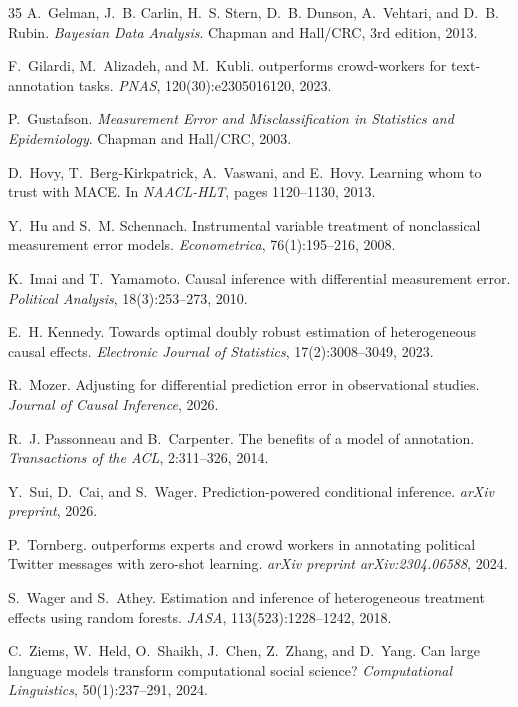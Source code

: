 \documentclass[11pt,twocolumn]{article}
\begin{document}
\begin{thebibliography}{35}
A.~Gelman, J.~B. Carlin, H.~S. Stern, D.~B. Dunson, A.~Vehtari, and D.~B. Rubin.
\newblock \emph{Bayesian Data Analysis}.
\newblock Chapman and Hall/CRC, 3rd edition, 2013.

F.~Gilardi, M.~Alizadeh, and M.~Kubli.
 outperforms crowd-workers for text-annotation tasks.
\newblock \emph{PNAS}, 120(30):e2305016120, 2023.

P.~Gustafson.
\newblock \emph{Measurement Error and Misclassification in Statistics and Epidemiology}.
\newblock Chapman and Hall/CRC, 2003.

D.~Hovy, T.~Berg-Kirkpatrick, A.~Vaswani, and E.~Hovy.
\newblock Learning whom to trust with {MACE}.
\newblock In \emph{NAACL-HLT}, pages 1120--1130, 2013.

Y.~Hu and S.~M. Schennach.
\newblock Instrumental variable treatment of nonclassical measurement error models.
\newblock \emph{Econometrica}, 76(1):195--216, 2008.

K.~Imai and T.~Yamamoto.
\newblock Causal inference with differential measurement error.
\newblock \emph{Political Analysis}, 18(3):253--273, 2010.

E.~H. Kennedy.
\newblock Towards optimal doubly robust estimation of heterogeneous causal effects.
\newblock \emph{Electronic Journal of Statistics}, 17(2):3008--3049, 2023.

R.~Mozer.
\newblock Adjusting for differential prediction error in observational studies.
\newblock \emph{Journal of Causal Inference}, 2026.

R.~J. Passonneau and B.~Carpenter.
\newblock The benefits of a model of annotation.
\newblock \emph{Transactions of the ACL}, 2:311--326, 2014.

Y.~Sui, D.~Cai, and S.~Wager.
\newblock Prediction-powered conditional inference.
\newblock \emph{arXiv preprint}, 2026.

P.~Tornberg.
 outperforms experts and crowd workers in annotating political {Twitter} messages with zero-shot learning.
\newblock \emph{arXiv preprint arXiv:2304.06588}, 2024.

S.~Wager and S.~Athey.
\newblock Estimation and inference of heterogeneous treatment effects using random forests.
\newblock \emph{JASA}, 113(523):1228--1242, 2018.

C.~Ziems, W.~Held, O.~Shaikh, J.~Chen, Z.~Zhang, and D.~Yang.
\newblock Can large language models transform computational social science?
\newblock \emph{Computational Linguistics}, 50(1):237--291, 2024.

\end{thebibliography}
\end{document}
